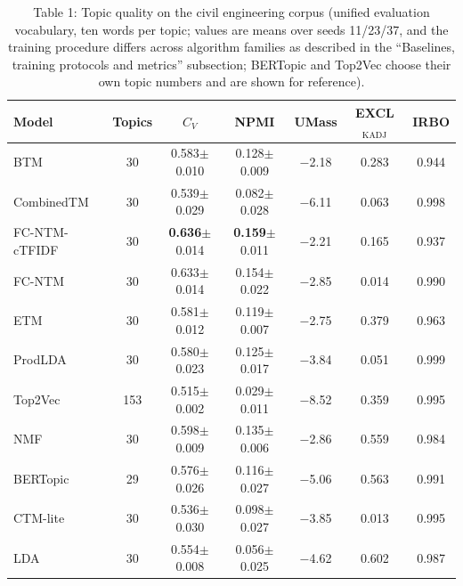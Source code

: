 \documentclass[Journal,letterpaper,NoLists]{ascelike-new}
\begin{document}
 \begin{table}[t]
\centering
\caption{Table 1: Topic quality on the civil engineering corpus (unified evaluation vocabulary, ten words per topic; values are means over seeds 11/23/37, and the training procedure differs across algorithm families as described in the ``Baselines, training protocols and metrics'' subsection; BERTopic and Top2Vec choose their own topic numbers and are shown for reference).}
\label{tab:civil}
\small
\begin{tabular}{lcccccc}
\toprule
Model & Topics & $C_V$ & NPMI & UMass & EXCL$_{\mathrm{KADJ}}$ & IRBO \\
\midrule
BTM & 30 & 0.583$\pm$0.010 & 0.128$\pm$0.009 & $-$2.18 & 0.283 & 0.944 \\
CombinedTM & 30 & 0.539$\pm$0.029 & 0.082$\pm$0.028 & $-$6.11 & 0.063 & 0.998 \\
FC-NTM-cTFIDF & 30 & \textbf{0.636}$\pm$0.014 & \textbf{0.159}$\pm$0.011 & $-$2.21 & 0.165 & 0.937 \\
FC-NTM & 30 & 0.633$\pm$0.014 & 0.154$\pm$0.022 & $-$2.85 & 0.014 & 0.990 \\
ETM & 30 & 0.581$\pm$0.012 & 0.119$\pm$0.007 & $-$2.75 & 0.379 & 0.963 \\
ProdLDA & 30 & 0.580$\pm$0.023 & 0.125$\pm$0.017 & $-$3.84 & 0.051 & 0.999 \\
Top2Vec & 153 & 0.515$\pm$0.002 & 0.029$\pm$0.011 & $-$8.52 & 0.359 & 0.995 \\
NMF & 30 & 0.598$\pm$0.009 & 0.135$\pm$0.006 & $-$2.86 & 0.559 & 0.984 \\
BERTopic & 29 & 0.576$\pm$0.026 & 0.116$\pm$0.027 & $-$5.06 & 0.563 & 0.991 \\
CTM-lite & 30 & 0.536$\pm$0.030 & 0.098$\pm$0.027 & $-$3.85 & 0.013 & 0.995 \\
LDA & 30 & 0.554$\pm$0.008 & 0.056$\pm$0.025 & $-$4.62 & 0.602 & 0.987 \\
\bottomrule
\end{tabular}
\end{table}
\end{document}
